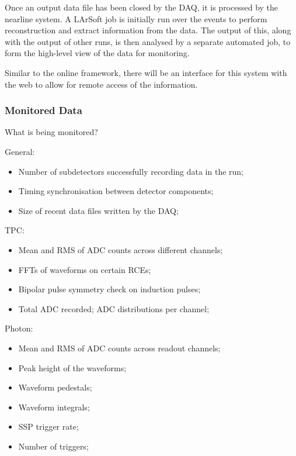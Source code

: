 Once an output data file has been closed by the DAQ, it is processed by the
nearline system.  A LArSoft job is initially run over the events to perform
reconstruction and extract information from the data.  The output of this,
along with the output of other runs, is then analysed by a separate automated
job, to form the high-level view of the data for monitoring.

Similar to the online framework, there will be an interface for this system
with the web to allow for remote access of the information.

\subsubsection{Monitored Data}

What is being monitored?

General:
\begin{itemize}
\item{Number of subdetectors successfully recording data in the run;}
\item{Timing synchronisation between detector components;}
\item{Size of recent data files written by the DAQ;}
\end{itemize}
  TPC:
\begin{itemize}
\item{Mean and RMS of ADC counts across different channels;}
\item{FFTs of waveforms on certain RCEs;}
\item{Bipolar pulse symmetry check on induction pulses;}
\item{Total ADC recorded; ADC distributions per channel;}
\end{itemize}
Photon:
\begin{itemize}
\item{Mean and RMS of ADC counts across readout channels;}
\item{Peak height of the waveforms;}
\item{Waveform pedestals;}
\item{Waveform integrals;}
\item{SSP trigger rate;}
\item{Number of triggers;}
\end{itemize}


